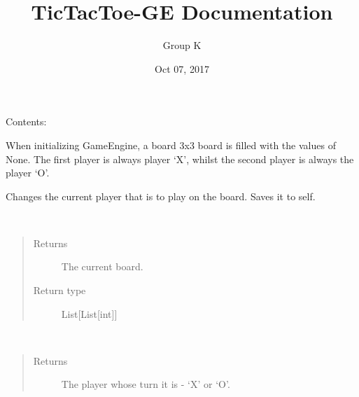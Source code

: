 \documentclass[letterpaper,10pt,english]{sphinxmanual}
\title{TicTacToe-GE Documentation}
\date{Oct 07, 2017}
\author{Group K}
\begin{document}
\maketitle
\tableofcontents
{}\label{index::doc}


Contents:
\label{index:module-GameEngine}

\begin{fulllineitems}
\label{index:GameEngine.GameEngine}
When initializing GameEngine, a board 3x3 board is filled with the values of None. The first player
is always player `X', whilst the second player is always the player `O'.

\begin{fulllineitems}
\label{index:GameEngine.GameEngine.changePlayer}
Changes the current player that is to play on the board. Saves it to self.

\end{fulllineitems}


\begin{fulllineitems}
\label{index:GameEngine.GameEngine.getBoard}~\begin{quote}\begin{description}
\item[{Returns}] \leavevmode
The current board.

\item[{Return type}] \leavevmode
List{[}List{[}int{]}{]}

\end{description}\end{quote}

\end{fulllineitems}


\begin{fulllineitems}
\label{index:GameEngine.GameEngine.getPlayer}~\begin{quote}\begin{description}
\item[{Returns}] \leavevmode
The player whose turn it is - `X' or `O'.


\end{description}
\end{quote}
\end{fulllineitems}
\end{fulllineitems}
\end{document}
